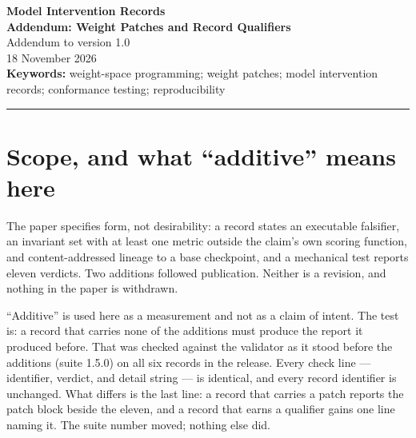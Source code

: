 \documentclass[11pt]{article}
\begin{document}
\thispagestyle{plain}
\begin{center}
\vspace*{0.4em}
{\LARGE\bfseries Model Intervention Records}\\[0.35em]
{\LARGE\bfseries Addendum: Weight Patches and Record Qualifiers}\\[0.8em]
{\large Addendum to version 1.0}\\[0.25em]
{\large 18 November 2026}\\[0.8em]
{\small\textbf{Keywords:} weight-space programming; weight patches; model
intervention records; conformance testing; reproducibility}
\end{center}
\vspace{0.2em}
\hrule
\vspace{0.6em}

\begin{abstract}
Version 1.0 of this work specified a record format and eleven checks. Two
documents were subsequently published beside it: one defines a composable
payload for the \texttt{weights} intervention type and five checks reported in a
separate block; the other names four measurements the evidence already carries.
This addendum records both in one citable place and states exactly what did and
did not change. No requirement was withdrawn, no member was added to a record,
no canonical byte changed, and no identifier moved. The eleven checks of version
1.0 are the eleven checks of suite 1.7.0. What was added is a wider payload and
a finer vocabulary for evidence, not a new test.
\end{abstract}

\section{Scope, and what ``additive'' means here}

The paper specifies form, not desirability: a record states an executable
falsifier, an invariant set with at least one metric outside the claim's own
scoring function, and content-addressed lineage to a base checkpoint, and a
mechanical test reports eleven verdicts. Two additions followed publication.
Neither is a revision, and nothing in the paper is withdrawn.

``Additive'' is used here as a measurement and not as a claim of intent. The
test is: a record that carries none of the additions must produce the report it
produced before. That was checked against the validator as it stood before the
additions (suite 1.5.0) on all six records in the release. Every check line ---
identifier, verdict, and detail string --- is identical, and every record
identifier is unchanged. What differs is the last line: a record that carries a
patch reports the patch block beside the eleven, and a record that earns a
qualifier gains one line naming it. The suite number moved; nothing else did.
\end{document}
